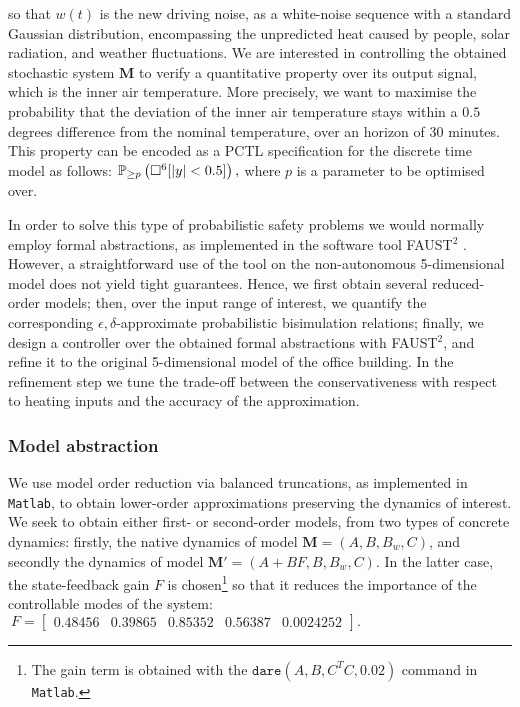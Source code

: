 \documentclass[letterpaper, 10 pt, conference]{amsart}
\theoremstyle{definition}
\theoremstyle{example}
\theoremstyle{remark}
\begin{document}
so that $w(t)$ is the new driving noise, as a white-noise sequence with a standard Gaussian distribution,  
encompassing the unpredicted heat caused by people, solar radiation, and weather fluctuations. 
We are interested in controlling the obtained stochastic system $\mathbf M$ to verify a quantitative property over its output signal, 
which is the inner air temperature. 
More precisely, we want to maximise the probability that the deviation of the inner air temperature stays within a $0.5$ degrees difference from the nominal temperature, 
over an horizon of 30 minutes. 
This property can be encoded as a  PCTL  specification for the discrete time model as follows: 
\(
\mathbb{P}_{\geq p}\left(  \Box^6[ |y|<0.5]\right), 
\) where $p$ is a parameter to be optimised over.  

In order to solve this type of probabilistic safety problems we would normally employ formal abstractions, as implemented in the software tool FAUST$^2$ \cite{FAUST13}. 
However, a straightforward use of the tool on the non-autonomous 5-dimensional model does not yield tight guarantees. 
Hence, we first obtain several reduced-order models;  
then, over the input range of interest, we quantify the corresponding $\epsilon,\delta$-approximate probabilistic bisimulation relations;  
finally, we design a controller over the obtained formal abstractions with FAUST$^2$, and refine it to the original 5-dimensional model of the office building.  
In the refinement step we tune the trade-off between the conservativeness with respect to heating inputs and the accuracy of the approximation. 

\subsubsection*{Model abstraction}
We use model order reduction via balanced truncations, as implemented in \texttt{Matlab}, 
to obtain lower-order approximations preserving the dynamics of interest. 
We seek to obtain either first- or second-order models, 
from two types of concrete dynamics: 
firstly, the native dynamics of model $\mathbf M=(A,B,B_w,C)$, 
and secondly the dynamics of model $\mathbf M'=(A+BF,B,B_w,C)$. 
In the latter case, the state-feedback gain $F$ is chosen\footnote{The gain term is obtained with the $\texttt{dare}(A,B,C^TC,0.02)$ command in \texttt{Matlab}. } so that it reduces the importance of the controllable modes of the system: 
\(\
F=\begin{bmatrix}
  0.48456 &     0.39865  &    0.85352   &   0.56387  &  0.0024252
\end{bmatrix}.\)
\end{document}
